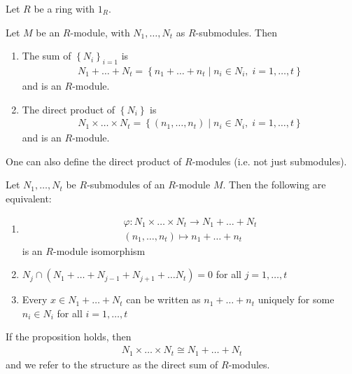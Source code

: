 \documentclass{memoir}
\begin{document}


Let \(R\) be a ring with \(1_R\).
\begin{prop}
	Let \(M\) be an \(R\)-module, with \(N_1,\ldots,N_t\) as \(R\)-submodules. Then
	\begin{enumerate}
		\item The sum of \(\left\{ N_i \right\}_{i=1}\) is
			\begin{align*}
				N_1+\ldots+N_t = \left\{n_1+\ldots+n_t \mid n_i \in N_i, \; i=1,\ldots,t \right\} 
			\end{align*}
			and is an \(R\)-module.
		\item The direct product of \(\left\{ N_i \right\} \) is
			\begin{align*}
				N_1\times \ldots\times N_t = \left\{(n_1,\ldots,n_t) \mid n_i \in N_i, \; i=1,\ldots,t \right\} 
			\end{align*}
			and is an \(R\)-module.
	\end{enumerate}
\end{prop}
One can also define the direct product of \(R\)-modules (i.e. not just submodules).

\begin{prop}
	Let \(N_1,\ldots,N_t\) be \(R\)-submodules of an \(R\)-module \(M\). Then the following are equivalent:
	\begin{enumerate}
		\item
			\begin{align*}
				\varphi:N_1\times \ldots\times N_t \to N_1+\ldots+N_t\\
				(n_1,\ldots,n_t) \mapsto n_1+\ldots+n_t
			\end{align*}
			is an \(R\)-module isomorphism
		\item \(N_j \cap (N_1+\ldots+N_{j-1}+N_{j+1} + \ldots N_t) = 0\) for all \(j=1,\ldots,t\)
		\item Every \(x \in N_1+\ldots+N_t\) can be written as \(n_1+\ldots+n_t\) uniquely for some \(n_i \in N_i\) for all \(i=1,\ldots,t\)
	\end{enumerate}
\end{prop}
If the proposition holds, then
\begin{align*}
	N_1\times \ldots\times N_t \cong N_1+\ldots+N_t
\end{align*}
and we refer to the structure as the direct sum of \(R\)-modules.
\end{document}
